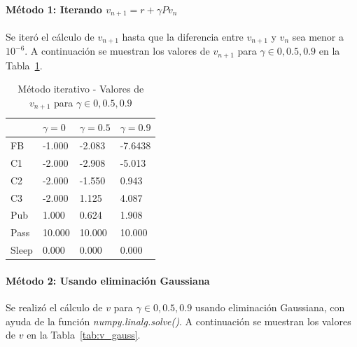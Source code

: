 \paragraph{Método 1: Iterando $v_{n+1} = r + \gamma P v_n$}
Se iteró el cálculo de $v_{n+1}$ hasta que la diferencia entre $v_{n+1}$ y $v_n$ sea menor a $10^{-6}$.
A continuación se muestran los valores de $v_{n+1}$ para $\gamma \in {0,0.5,0.9}$ en la Tabla~\ref{tab:v_iter}\footnotemark.


\begin{table}[H]
    \centering
    \caption{Método iterativo - Valores de $v_{n+1}$ para $\gamma \in {0,0.5,0.9}$}
    \label{tab:v_iter}
    \begin{tabular}{l|l|l|l}
        & $\gamma=0$ & $\gamma=0.5$ & $\gamma=0.9$ \\ \hline
        FB    & -1.000    & -2.083         & -7.6438         \\ \hline
        C1    & -2.000    & -2.908         & -5.013         \\ \hline
        C2    & -2.000    & -1.550         & 0.943         \\ \hline
        C3    & -2.000    & 1.125         & 4.087         \\ \hline
        Pub   & 1.000     & 0.624          & 1.908          \\ \hline
        Pass  & 10.000    & 10.000           & 10.000           \\ \hline
        Sleep & 0.000     & 0.000            & 0.000
    \end{tabular}
\end{table}

\paragraph{Método 2: Usando eliminación Gaussiana}
Se realizó el cálculo de $v$ para $\gamma \in {0,0.5,0.9}$ usando eliminación Gaussiana, con ayuda de la función \textit{numpy.linalg.solve()}.
A continuación se muestran los valores de $v$ en la Tabla~\ref{tab:v_gauss}\footnotemark.


